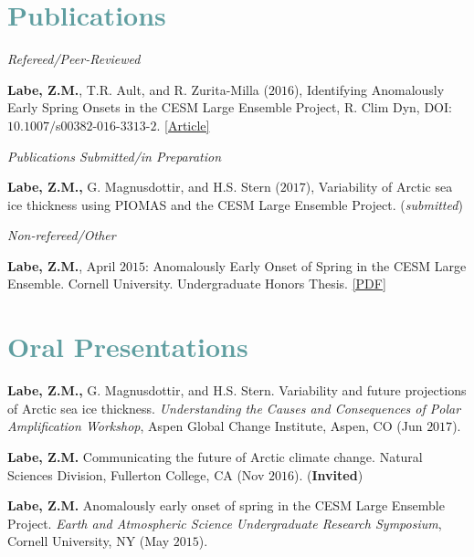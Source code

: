 \documentclass[margin,line,palatino,courier,10pt]{res}
\begin{document}
\begin{resume}
\section{\sc \large{\textcolor{CadetBlue}{Publications}}}
\textit{Refereed/Peer-Reviewed}
\vspace*{-0.1in}\\
\begin{etaremune}[leftmargin=0in,topsep=0in,parsep=0in]
\item \textbf{Labe, Z.M.}, T.R. Ault, and R. Zurita-Milla ($2016$), Identifying Anomalously Early Spring Onsets in the CESM Large Ensemble Project, R. Clim Dyn, DOI:$10.1007/$s$00382$-$016$-$3313$-$2$. \href{http://link.springer.com/article/10.1007/s00382-016-3313-2}{[Article]}
\end{etaremune}

\textit{Publications Submitted/in Preparation}
\vspace*{-0.1in}\\
\begin{etaremune}[leftmargin=0in,topsep=0in,parsep=0in]
\item \textbf{Labe, Z.M.,} G. Magnusdottir, and H.S. Stern ($2017$), Variability of Arctic sea ice thickness using PIOMAS and the CESM Large Ensemble Project. (\textit{submitted})
\end{etaremune}

\textit{Non-refereed/Other}
\vspace*{-0.1in}\\
\begin{etaremune}[leftmargin=0in,topsep=0in,parsep=0in]
\item \textbf{Labe, Z.M.}, April $2015$: Anomalously Early Onset of Spring in the CESM Large Ensemble. Cornell University. Undergraduate Honors Thesis. \href{http://sites.uci.edu/zlabe/files/2015/11/Labe_Thesis2015.pdf}{[PDF]}
\end{etaremune}

\section{\sc \textcolor{CadetBlue}{\large{Oral Presentations}}}
\begin{etaremune}[leftmargin=0in,topsep=0in,parsep=0in]
\item \textbf{Labe, Z.M.,} G. Magnusdottir, and H.S. Stern. Variability and future projections of Arctic sea ice thickness. \textit{Understanding the Causes and Consequences of Polar Amplification Workshop}, Aspen Global Change Institute, Aspen, CO (Jun $2017$). 
\item \textbf{Labe, Z.M.} Communicating the future of Arctic climate change. Natural Sciences Division, Fullerton College, CA (Nov $2016$). (\textbf{Invited})
\item \textbf{Labe, Z.M.} Anomalously early onset of spring in the CESM Large Ensemble Project. \textit{Earth and Atmospheric Science Undergraduate Research Symposium}, Cornell University, NY (May $2015$). 


\end{etaremune}
\end{resume}
\end{document}
